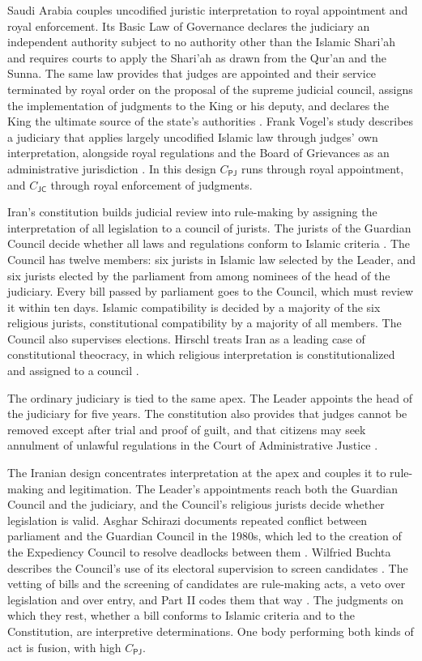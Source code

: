 \documentclass[11pt,letterpaper]{article}
\theoremstyle{definition}
\theoremstyle{remark}
\newcommand{\pP}{\mathsf{P}}
\newcommand{\pJ}{\mathsf{J}}
\newcommand{\pC}{\mathsf{C}}
\begin{document}
Saudi Arabia couples uncodified juristic interpretation to royal appointment and royal enforcement. Its Basic Law of Governance declares the judiciary an independent authority subject to no authority other than the Islamic Shari'ah and requires courts to apply the Shari'ah as drawn from the Qur'an and the Sunna. The same law provides that judges are appointed and their service terminated by royal order on the proposal of the supreme judicial council, assigns the implementation of judgments to the King or his deputy, and declares the King the ultimate source of the state's authorities \citep{saudibasic}. Frank Vogel's study describes a judiciary that applies largely uncodified Islamic law through judges' own interpretation, alongside royal regulations and the Board of Grievances as an administrative jurisdiction \citep{vogel2000}. In this design $C_{\pP\pJ}$ runs through royal appointment, and $C_{\pJ\pC}$ through royal enforcement of judgments.

Iran's constitution builds judicial review into rule-making by assigning the interpretation of all legislation to a council of jurists. The jurists of the Guardian Council decide whether all laws and regulations conform to Islamic criteria \citep{iranconst}. The Council has twelve members: six jurists in Islamic law selected by the Leader, and six jurists elected by the parliament from among nominees of the head of the judiciary. Every bill passed by parliament goes to the Council, which must review it within ten days. Islamic compatibility is decided by a majority of the six religious jurists, constitutional compatibility by a majority of all members. The Council also supervises elections. Hirschl treats Iran as a leading case of constitutional theocracy, in which religious interpretation is constitutionalized and assigned to a council \citep{hirschl2010}.

The ordinary judiciary is tied to the same apex. The Leader appoints the head of the judiciary for five years. The constitution also provides that judges cannot be removed except after trial and proof of guilt, and that citizens may seek annulment of unlawful regulations in the Court of Administrative Justice \citep{iranconst}.

The Iranian design concentrates interpretation at the apex and couples it to rule-making and legitimation. The Leader's appointments reach both the Guardian Council and the judiciary, and the Council's religious jurists decide whether legislation is valid. Asghar Schirazi documents repeated conflict between parliament and the Guardian Council in the 1980s, which led to the creation of the Expediency Council to resolve deadlocks between them \citep{schirazi1997}. Wilfried Buchta describes the Council's use of its electoral supervision to screen candidates \citep{buchta2000}. The vetting of bills and the screening of candidates are rule-making acts, a veto over legislation and over entry, and Part II codes them that way \citep{long2026political}. The judgments on which they rest, whether a bill conforms to Islamic criteria and to the Constitution, are interpretive determinations. One body performing both kinds of act is fusion, with high $C_{\pP\pJ}$.
\end{document}
